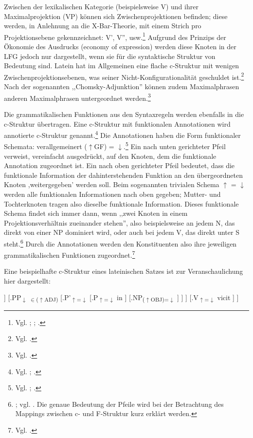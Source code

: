 \documentclass[12pt,a4paper]{article}
\begin{document}
Zwischen der lexikalischen Kategorie (beispielsweise V) und ihrer Maximalprojektion (VP) können sich Zwischenprojektionen befinden; diese werden, in Anlehnung an die X-Bar-Theorie, mit einem Strich pro Projektionsebene gekennzeichnet: V', V'', usw.\footnote{Vgl. \cite[15-6]{Rohrer}; \cite[56-7]{Dal}; \cite[5]{Skript}.} Aufgrund des Prinzips der Ökonomie des Ausdrucks (economy of expression) werden diese Knoten in der LFG jedoch nur dargestellt, wenn sie für die syntaktische Struktur von Bedeutung sind. Latein hat im Allgemeinen eine flache c-Struktur mit wenigen Zwischenprojektionsebenen, was seiner Nicht-Konfigurationalität geschuldet ist.\footnote{Vgl. \cite[46]{Rohrer}.} Nach der sogenannten ,,Chomsky-Adjunktion'' können zudem Maximalphrasen anderen Maximalphrasen untergeordnet werden.\footnote{Vgl. \cite[46; 57]{Dal}.}

Die grammatikalischen Funktionen aus den Syntaxregeln werden ebenfalls in die c-Struktur übertragen. Eine c-Struktur mit funktionalen Annotationen wird annotierte c-Struktur genannt.\footnote{Vgl. \cite[69]{Falk}; \cite[22]{Rohrer}.} Die Annotationen haben die Form funktionaler Schemata: verallgemeinert ($\uparrow$GF) = $\downarrow$.\footnote{Vgl. \cite[33]{Rohrer}; \cite[15-6]{Skript}.} Ein nach unten gerichteter Pfeil verweist, vereinfacht ausgedrückt, auf den Knoten, dem die funktionale Annotation zugeordnet ist. Ein nach oben gerichteter Pfeil bedeutet, dass die funktionale Information der dahinterstehenden Funktion an den übergeordneten Knoten ,weitergegeben' werden soll. Beim sogenannten trivialen Schema $\uparrow$ = $\downarrow$ werden alle funktionalen Informationen nach oben gegeben; Mutter- und Tochterknoten tragen also dieselbe funktionale Information. Dieses funktionale Schema findet sich immer dann, wenn ,,zwei Knoten in einem Projektionsverhältnis zueinander stehen'', also beispielsweise an jedem N, das direkt von einer NP dominiert wird, oder auch bei jedem V, das direkt unter S steht.\footnote{\cite[28]{Skript}; vgl. \cite[25; 33]{Rohrer}. Die genaue Bedeutung der Pfeile wird bei der Betrachtung des Mappings zwischen c- und F-Struktur kurz erklärt werden.} Durch die Annotationen werden den Konstituenten also ihre jeweiligen grammatikalischen Funktionen zugeordnet.\footnote{Vgl. \cite[28]{Skript}.}

Eine beispielhafte c-Struktur eines lateinischen Satzes ist zur Veranschaulichung hier dargestellt:

\begin{singlespace}
\Tree [.S 
		[.{NP\textsubscript{($\uparrow$OBJ)=$\downarrow$}}
			[.N\textsubscript{$\uparrow$=$\downarrow$} barbaros ]
		]							
		[.{PP\textsubscript{$\downarrow$ $\in$($\uparrow$ADJ)}}
			[.P'\textsubscript{$\uparrow$=$\downarrow$}						
				[.P\textsubscript{$\uparrow$=$\downarrow$} in ]
				[.{NP\textsubscript{($\uparrow$OBJ)=$\downarrow$}} ]
			]
        ] 	
        [.V\textsubscript{$\uparrow$=$\downarrow$} vicit ]						
	]
\end{singlespace}
\end{document}
